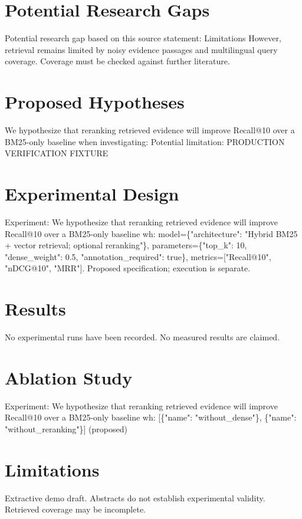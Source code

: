 \documentclass[conference]{IEEEtran}
\begin{document}
\section{Potential Research Gaps}

Potential research gap based on this source statement: Limitations
However, retrieval remains limited by noisy evidence passages and multilingual query coverage. Coverage must be checked against further literature.

\section{Proposed Hypotheses}

We hypothesize that reranking retrieved evidence will improve Recall@10 over a BM25-only baseline when investigating: Potential limitation: PRODUCTION VERIFICATION FIXTURE

\section{Experimental Design}

Experiment: We hypothesize that reranking retrieved evidence will improve Recall@10 over a BM25-only baseline wh: model=\{"architecture": "Hybrid BM25 + vector retrieval; optional reranking"\}, parameters=\{"top\_k": 10, "dense\_weight": 0.5, "annotation\_required": true\}, metrics=["Recall@10", "nDCG@10", "MRR"]. Proposed specification; execution is separate.

\section{Results}

No experimental runs have been recorded. No measured results are claimed.

\section{Ablation Study}

Experiment: We hypothesize that reranking retrieved evidence will improve Recall@10 over a BM25-only baseline wh: [\{"name": "without\_dense"\}, \{"name": "without\_reranking"\}] (proposed)

\section{Limitations}

Extractive demo draft. Abstracts do not establish experimental validity. Retrieved coverage may be incomplete.
\end{document}
